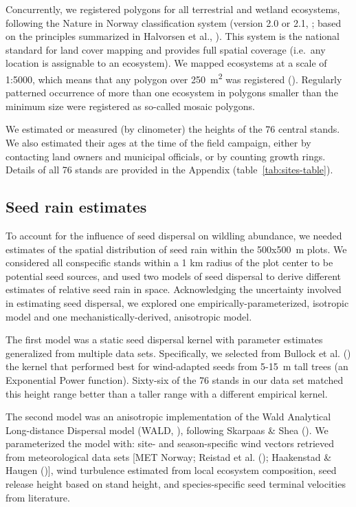 \documentclass[
]{article}
\begin{document}
Concurrently, we registered polygons for all terrestrial and wetland ecosystems,
following the Nature in Norway classification system (version 2.0 or 2.1, ; based on the principles summarized in Halvorsen et
al., ). This system is the national
standard for land cover mapping and provides full spatial coverage (i.e.~any
location is assignable to an ecosystem). We mapped ecosystems at a scale of
1:5000, which means that any polygon over 250~m\textsuperscript{2} was registered
(). Regularly patterned occurrence of more than
one ecosystem in polygons smaller than the minimum size were registered as
so-called mosaic polygons.

We estimated or measured (by clinometer) the heights of the 76 central stands.
We also estimated their ages at the time of the field campaign, either by
contacting land owners and municipal officials, or by counting growth rings.
Details of all 76 stands are provided in the Appendix
(table~\ref{tab:sites-table}).

\subsection{Seed rain estimates}\label{seed-rain-estimates}

To account for the influence of seed dispersal on wildling abundance, we needed
estimates of the spatial distribution of seed rain within the 500x500~m plots.
We considered all conspecific stands within a 1 km radius of the plot center to
be potential seed sources, and used two models of seed dispersal to derive
different estimates of relative seed rain in space. Acknowledging the
uncertainty involved in estimating seed dispersal, we explored one
empirically-parameterized, isotropic model and one mechanistically-derived,
anisotropic model.

The first model was a static seed dispersal kernel with parameter estimates
generalized from multiple data sets. Specifically, we selected from Bullock et
al. () the kernel that performed best for
wind-adapted seeds from 5-15~m tall trees (an Exponential Power function).
Sixty-six of the 76 stands in our data set matched this height range better than
a taller range with a different empirical kernel.

The second model was an anisotropic implementation of the Wald Analytical
Long-distance Dispersal model (WALD, ),
following Skarpaas \& Shea (). We
parameterized the model with: site- and season-specific wind vectors retrieved
from meteorological data sets {[}MET Norway;
Reistad et al. (); Haakenstad \& Haugen (){]},
wind turbulence estimated from local ecosystem composition, seed release height
based on stand height, and species-specific seed terminal velocities from
literature.
\end{document}
